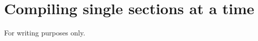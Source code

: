 \documentclass[a4paper, 11pt]{book}
\begin{document}
\chapter{Compiling single sections at a time}
For writing purposes only.




\end{document}
